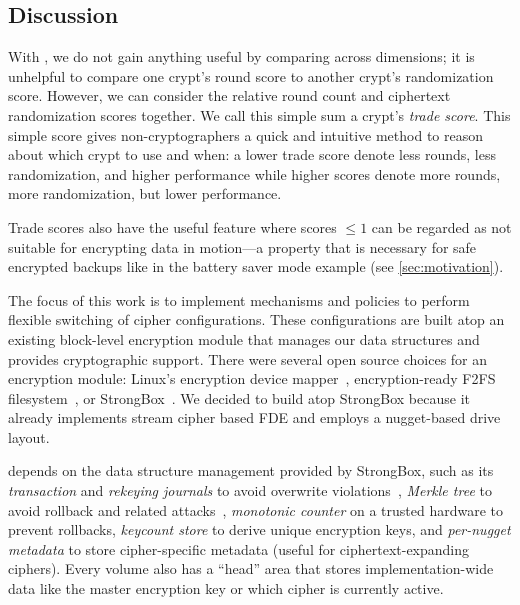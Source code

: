 \subsection{Discussion}\label{subsec:des-discussion}



 With \sysC, we do not gain anything useful by comparing
across dimensions; \ie it is unhelpful to compare one crypt's round score to
another crypt's randomization score. However, we can consider the relative round
count and ciphertext randomization scores together. We call this simple sum a
crypt's {\em trade score}. This simple score gives non-cryptographers a quick
and intuitive method to reason about which crypt to use and when: a lower trade
score denote less rounds, less randomization, and higher performance while
higher scores denote more rounds, more randomization, but lower performance.

Trade scores also have the useful feature where scores $\leq1$ can be regarded
as not suitable for encrypting data in motion---a property that is necessary for
safe encrypted backups like in the battery saver mode example (see
\cref{sec:motivation}).


 The focus of this work is to implement
mechanisms and policies to perform flexible switching of cipher configurations.
These configurations are built atop an existing block-level encryption module
that manages our data structures and provides cryptographic support. There were
several open source choices for an encryption module: Linux's encryption device
mapper~\cite{dmcrypt,DmC-Android}, encryption-ready F2FS filesystem~\cite{F2FS},
or StrongBox~\cite{StrongBox}. We decided to build \sys atop StrongBox because
it already implements stream cipher based FDE and employs a nugget-based drive
layout.

\sys depends on the data structure management provided by StrongBox, such as its
{\em transaction} and {\em rekeying journals} to avoid overwrite
violations~\cite{StrongBox}, {\em Merkle tree} to avoid rollback and related
attacks~\cite{StrongBox}, {\em monotonic counter} on a trusted hardware to
prevent rollbacks, {\em keycount store} to derive unique encryption keys, and
{\em per-nugget metadata} to store cipher-specific metadata (useful for
ciphertext-expanding ciphers). Every \sys volume also has a ``head'' area that
stores implementation-wide data like the master encryption key or which cipher
is currently active.

